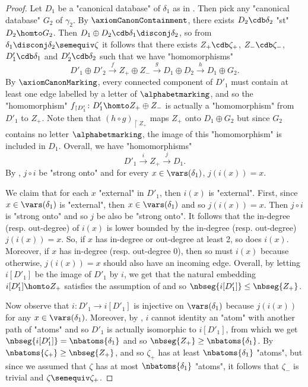 \begin{proof}
	Let $D_1$ be a "canonical database" of $\delta_1$ as in \axiomCanonCore{}.
	Then pick any "canonical database" $G_2$ of $\gamma_2$.
	By $\axiomCanonContainment$, there exists $D_2 \cdb \delta_2$ "st" $D_2 \homto G_2$.
	Then $D_1 \oplus D_2 \cdb \delta_1 \disconj \delta_2$, so from $\delta_1 \disconj \delta_2 \semequiv \zeta$
	it follows that there exists $Z_+ \cdb \zeta_+$, $Z_- \cdb \zeta_-$, $D'_1 \cdb \delta_1$ and $D'_2 \cdb \delta_2$
	such that we have "homomorphisms"
	\[
		D'_1 \oplus D'_2
		\xrightarrow{f}
		Z_+ \oplus Z_-
		\xrightarrow{g}
		D_1 \oplus D_2
		\xrightarrow{h}
		D_1 \oplus G_2.
	\]
	By $\axiomCanonMarking$, every connected component of $D'_1$ must contain at least one edge labelled
	by a letter of $\alphabetmarking$, and so the "homomorphism" $f_{\restriction{D'_1}}\colon
	D'_1 \homto Z_+ \oplus Z_-$ is actually a "homomorphism" from $D'_1$ to $Z_+$.
	Note then that $(h \circ g)_{\restriction{Z_+}}$ maps $Z_+$ onto $D_1 \oplus G_2$ but
	since $G_2$ contains no letter $\alphabetmarking$, the image of this "homomorphism" is included in $D_1$.
	Overall, we have "homomorphisms"
	\[D'_1 \xrightarrow{i} Z_+ \xrightarrow{j} D_1.\] 
	By \axiomCanonCore{}, $j\circ i$ be "strong onto" and for every $x\in \vars(\delta_1)$,
	$j(i(x)) = x$.
	
	We claim that for each $x$ "external" in $D'_1$, then $i(x)$ is "external".
	First, since $x \in \vars(\delta_1)$ is "external", then $x \in \vars(\delta_1)$
	and so $j(i(x)) = x$. Then $j \circ i$ is "strong onto" and so $j$ be also be
	"strong onto". It follows that the in-degree (resp. out-degree) of $i(x)$
	is lower bounded by the in-degree (resp. out-degree) $j(i(x)) = x$.
	So, if $x$ has in-degree or out-degree at least 2, so does $i(x)$.
	Moreover, if $x$ has in-degree (resp. out-degree 0), then 
	so must $i(x)$ because otherwise, $j(i(x)) = x$ should also have an incoming edge.
	Overall, by letting $i[D'_1]$ be the image of $D'_1$ by $i$,
	we get that the natural embedding $i[D'_1] \homto Z_+$ satisfies the assumption
	of  and so $\nbseg{i[D'_1]} \leq \nbseg{Z_+}$.
	
	Now observe that $i\colon D'_1 \to i[D'_1]$ is injective on $\vars(\delta_1)$
	because $j(i(x))$ for any $x\in \vars(\delta_1)$.
	Moreover, by \axiomCanonNonRed{}, $i$ cannot identity an "atom" with another path of "atoms" and so $D'_1$ is actually isomorphic to $i[D'_1]$, from which we
	get $\nbseg{i[D'_1]} = \nbatoms{\delta_1}$
	and so $\nbseg{Z_+} \geq \nbatoms{\delta_1}$.
	By  $\nbatoms{\zeta_+} \geq \nbseg{Z_+}$, and so $\zeta_+$ has at least $\nbatoms{\delta_1}$
	"atoms", but since we assumed that $\zeta$ has at most $\nbatoms{\delta_1}$ "atoms",
	it follows that $\zeta_-$ is trivial and $\zeta \semequiv \zeta_+$.
	

\end{proof}
